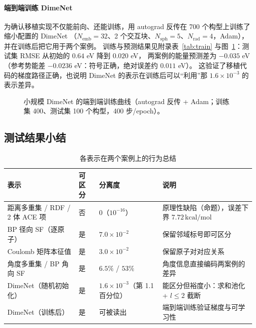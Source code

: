 \documentclass[UTF8,a4paper,11pt]{ctexart}
\newcommand{\kcal}{\,\mathrm{kcal/mol}}
\begin{document}
\paragraph{端到端训练 DimeNet}
为确认移植实现不仅能前向、还能训练，用 autograd 反传在 700 个构型上训练了缩小配置的 DimeNet
（$N_{\mathrm{emb}}=32$、2 个交互块、$N_{\mathrm{sph}}=5$、$N_{\mathrm{rad}}=4$，Adam），并在训练后把它用于两个案例。
训练与预测结果见附录表~\ref{tab:train} 与图~\ref{fig:train}：测试集 RMSE 从初始的 $0.64$ eV 降到 $0.020$ eV，
两案例的能量预测差为 $-0.035$ eV（参考势能差 $-0.0236$ eV：符号正确，绝对误差约 $0.011$ eV）。
这验证了移植代码的梯度路径正确，也说明 DimeNet 的表示在训练后可以“利用”那 $1.6\times10^{-3}$ 的表示差异。
\begin{figure}[H]
\centering
{}
\caption{小规模 DimeNet 的端到端训练曲线（autograd 反传 + Adam；训练集 400、测试集 100 个构型，400 步/epoch）。}
\label{fig:train}
\end{figure}

\subsection{测试结果小结}
\begin{table}[H]
\centering\small
\caption{各表示在两个案例上的行为总结}
\label{tab:summary}
\begin{tabular}{@{}p{4.4cm}p{2.6cm}p{2.8cm}p{4.7cm}@{}}
\toprule
表示 & 可区分 & 分离度 & 说明\\
\midrule
距离多重集 / RDF / 2 体 ACE 项 & 否 & $0$（$10^{-16}$） & 原理性缺陷（命题），误差下界 $7.72\kcal$\\
BP 径向 SF（逐原子） & 是 & $7.0\times10^{-2}$ & 保留邻域标号即可区分\\
Coulomb 矩阵本征值 & 是 & $3.0\times10^{-2}$ & 保留原子对对应关系\\
角度多重集 / BP 角向 SF & 是 & $6.5\%$ / $53\%$ & 角度信息直接编码两案例的差异\\
DimeNet（随机初始化） & 是 & $1.6\times10^{-3}$（第 1.1 百分位） & 能区分但裕度小：求和池化 + $l\le2$ 截断\\
DimeNet（训练后） & 是 & 可被读出 & 端到端训练验证梯度与可学习性\\
\bottomrule
\end{tabular}
\end{table}
\end{document}
